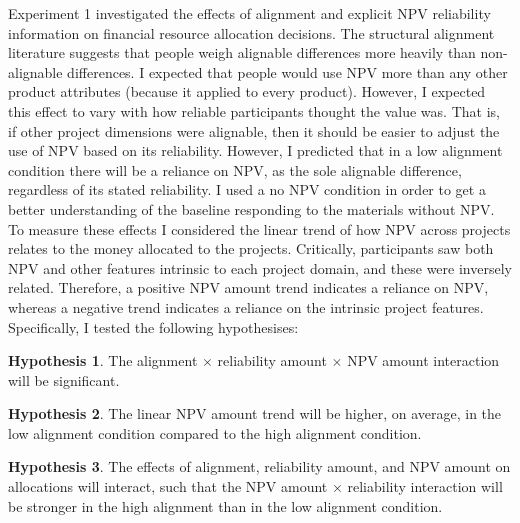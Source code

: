 \documentclass[a4paper, nobind, dvipsnames]{templates/ociamthesis}
\theoremstyle{definition}
\theoremstyle{definition}
\theoremstyle{definition}
\theoremstyle{definition}
\newtheorem{hypothesis}{Hypothesis}[chapter]
\theoremstyle{remark}
\begin{document}
Experiment 1 investigated the effects of alignment and explicit NPV reliability
information on financial resource allocation decisions. The structural alignment
literature suggests that people weigh alignable differences more heavily than
non-alignable differences. I expected that people would use NPV more than any
other product attributes (because it applied to every product). However, I
expected this effect to vary with how reliable participants thought the value
was. That is, if other project dimensions were alignable, then it should be
easier to adjust the use of NPV based on its reliability. However, I predicted
that in a low alignment condition there will be a reliance on NPV, as the sole
alignable difference, regardless of its stated reliability. I used a no NPV
condition in order to get a better understanding of the baseline responding to
the materials without NPV. To measure these effects I considered the linear
trend of how NPV across projects relates to the money allocated to the projects.
Critically, participants saw both NPV and other features intrinsic to each
project domain, and these were inversely related. Therefore, a positive NPV
amount trend indicates a reliance on NPV, whereas a negative trend indicates a
reliance on the intrinsic project features. Specifically, I tested the following
hypothesises:

\begin{hypothesis}
\protect\hypertarget{hyp:three-way-alignment-2}{}{\label{hyp:three-way-alignment-2} }The alignment \(\times\) reliability amount \(\times\) NPV amount interaction will
be significant.
\end{hypothesis}

\begin{hypothesis}
\protect\hypertarget{hyp:allocation-alignment-alignment-2}{}{\label{hyp:allocation-alignment-alignment-2} }The linear NPV amount trend will be higher, on average, in the low alignment
condition compared to the high alignment condition.
\end{hypothesis}

\begin{hypothesis}
\protect\hypertarget{hyp:allocation-alignment-reliability-npv-alignment-2}{}{\label{hyp:allocation-alignment-reliability-npv-alignment-2} }The effects of alignment, reliability amount, and NPV amount on allocations will
interact, such that the NPV amount \(\times\) reliability interaction will be
stronger in the high alignment than in the low alignment condition.
\end{hypothesis}
\end{document}
